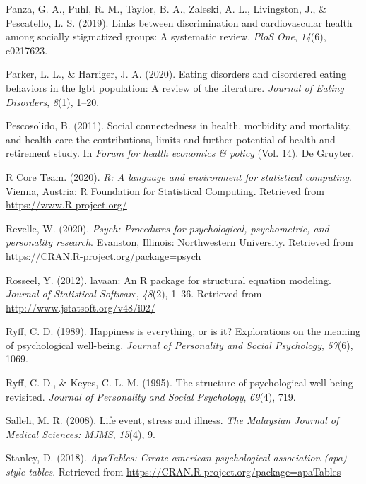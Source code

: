\documentclass[
  english,
  man,floatsintext]{apa6}
\begin{document}
\leavevmode\hypertarget{ref-panza2019}{}%
Panza, G. A., Puhl, R. M., Taylor, B. A., Zaleski, A. L., Livingston, J., \& Pescatello, L. S. (2019). Links between discrimination and cardiovascular health among socially stigmatized groups: A systematic review. \emph{PloS One}, \emph{14}(6), e0217623.

\leavevmode\hypertarget{ref-parker2020}{}%
Parker, L. L., \& Harriger, J. A. (2020). Eating disorders and disordered eating behaviors in the lgbt population: A review of the literature. \emph{Journal of Eating Disorders}, \emph{8}(1), 1--20.

\leavevmode\hypertarget{ref-pescosolido2011}{}%
Pescosolido, B. (2011). Social connectedness in health, morbidity and mortality, and health care-the contributions, limits and further potential of health and retirement study. In \emph{Forum for health economics \& policy} (Vol. 14). De Gruyter.

\leavevmode\hypertarget{ref-R-base}{}%
R Core Team. (2020). \emph{R: A language and environment for statistical computing}. Vienna, Austria: R Foundation for Statistical Computing. Retrieved from \url{https://www.R-project.org/}

\leavevmode\hypertarget{ref-R-psych}{}%
Revelle, W. (2020). \emph{Psych: Procedures for psychological, psychometric, and personality research}. Evanston, Illinois: Northwestern University. Retrieved from \url{https://CRAN.R-project.org/package=psych}

\leavevmode\hypertarget{ref-R-lavaan}{}%
Rosseel, Y. (2012). lavaan: An R package for structural equation modeling. \emph{Journal of Statistical Software}, \emph{48}(2), 1--36. Retrieved from \url{http://www.jstatsoft.org/v48/i02/}

\leavevmode\hypertarget{ref-ryff1989}{}%
Ryff, C. D. (1989). Happiness is everything, or is it? Explorations on the meaning of psychological well-being. \emph{Journal of Personality and Social Psychology}, \emph{57}(6), 1069.

\leavevmode\hypertarget{ref-ryffkeyes1995}{}%
Ryff, C. D., \& Keyes, C. L. M. (1995). The structure of psychological well-being revisited. \emph{Journal of Personality and Social Psychology}, \emph{69}(4), 719.

\leavevmode\hypertarget{ref-salleh2008}{}%
Salleh, M. R. (2008). Life event, stress and illness. \emph{The Malaysian Journal of Medical Sciences: MJMS}, \emph{15}(4), 9.

\leavevmode\hypertarget{ref-R-apaTables}{}%
Stanley, D. (2018). \emph{ApaTables: Create american psychological association (apa) style tables}. Retrieved from \url{https://CRAN.R-project.org/package=apaTables}
\end{document}
